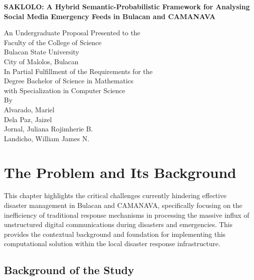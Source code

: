 \documentclass[12pt,a4paper]{report}
\begin{document}
\begin{titlepage}
\centering
{\Large\bfseries SAKLOLO: A Hybrid Semantic-Probabilistic Framework for
Analysing Social Media Emergency Feeds in Bulacan and CAMANAVA\par}
\vspace{2.5cm}

An Undergraduate Proposal Presented to the\\
Faculty of the College of Science\\
Bulacan State University\\
City of Malolos, Bulacan\\[1.2cm]

In Partial Fulfillment of the Requirements for the\\
Degree Bachelor of Science in Mathematics\\
with Specialization in Computer Science\\[2.5cm]

By\\[0.6cm]
Alvarado, Mariel\\ %
Dela Paz, Jaizel\\ %
Jornal, Juliana Rojimherie B.\\ %
Landicho, William James N.\\[2.5cm] %

\end{titlepage}

\tableofcontents

\chapter{The Problem and Its Background}

This chapter highlights the critical challenges currently hindering effective
disaster management in Bulacan and CAMANAVA, specifically focusing on the
inefficiency of traditional response mechanisms in processing the massive
influx of unstructured digital communications during disasters and
emergencies. This provides the contextual background and foundation for
implementing this computational solution within the local disaster response
infrastructure.

\section{Background of the Study}
\end{document}
